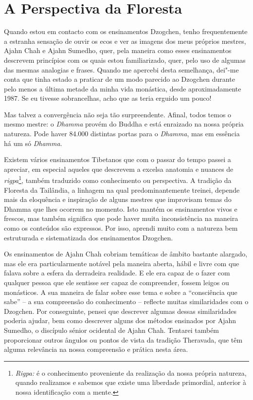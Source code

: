 \chapter{A Perspectiva da Floresta}

Quando estou em contacto com os ensinamentos Dzogchen, tenho
frequentemente a estranha sensação de ouvir os ecos e ver as imagens dos
meus próprios mestres, Ajahn Chah e Ajahn Sumedho, quer, pela maneira
como esses ensinamentos descrevem princípios com os quais estou
familiarizado, quer, pelo uso de algumas das mesmas analogias e frases.
Quando me apercebi desta semelhança, dei"-me conta que tinha estado a
praticar de um modo parecido ao Dzogchen durante pelo menos a última
metade da minha vida monástica, desde aproximadamente 1987. Se eu
tivesse sobrancelhas, acho que as teria erguido um pouco!

Mas talvez a convergência não seja tão surpreendente. Afinal, todos
temos o mesmo mestre: o \emph{Dhamma} provém do Buddha e está enraizado
na nossa própria natureza. Pode haver 84.000 distintas portas para o
\emph{Dhamma}, mas em essência há um só \emph{Dhamma}.

Existem vários ensinamentos Tibetanos que com o passar do tempo passei a
apreciar, em especial aqueles que descrevem a excelsa anatomia e nuances
de \emph{rigpa}\footnote{%
\emph{Rigpa:} é o conhecimento proveniente da realização da
nossa própria natureza, quando realizamos e sabemos que existe uma
liberdade primordial, anterior à nossa identificação com a mente.
}, também traduzido como conhecimento ou perspectiva.
A tradição da Floresta da Tailândia, a linhagem na qual
predominantemente treinei, depende mais da eloquência e inspiração de
alguns mestres que improvisam temas do Dhamma que lhes ocorrem no
momento. Isto mantém os ensinamentos vivos e frescos, mas também
significa que pode haver muita inconsistência na maneira como os
conteúdos são expressos. Por isso, aprendi muito com a natureza bem
estruturada e sistematizada dos ensinamentos Dzogchen.

Os ensinamentos de Ajahn Chah cobriam temáticas de âmbito bastante alargado, mas ele era
particularmente notável pela maneira aberta, hábil e livre com que
falava sobre a esfera da derradeira realidade. E ele era capaz de o
fazer com qualquer pessoa que ele sentisse ser capaz de compreender,
fossem leigos ou monásticos. A sua maneira de falar sobre esse tema e
sobre a ``consciência que sabe'' -- a sua compreensão do conhecimento
-- reflecte muitas similaridades com o Dzogchen. Por conseguinte, pensei
que descrever algumas dessas similaridades poderia ajudar, bem como
descrever alguns dos métodos ensinados por Ajahn Sumedho, o discípulo
sénior ocidental de Ajahn Chah. Tentarei também proporcionar outros
ângulos ou pontos de vista da tradição Theravada, que têm alguma
relevância na nossa compreensão e prática nesta área.

